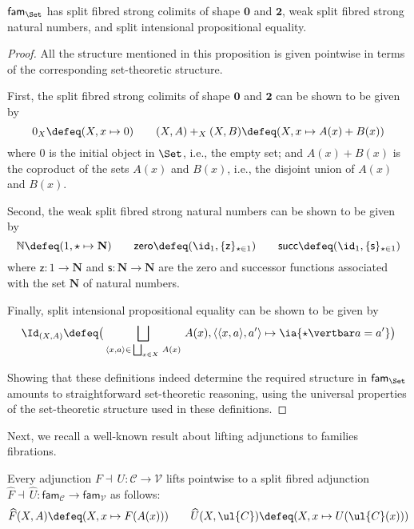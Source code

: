 \begin{proposition}
$\mathsf{fam}_{\Set}$ has split fibred strong colimits of shape $\mathbf{0}$ and $\mathbf{2}$, weak split fibred strong natural numbers, and split intensional propositional equality.
\end{proposition}

\begin{proof}
All the structure mentioned in this proposition is given pointwise in terms of the corresponding set-theoretic structure. 

First, the split fibred strong colimits of shape $\mathbf{0}$ and $\mathbf{2}$ can be shown to be given by
\[
0_X \defeq (X , x \mapsto 0) 
\qquad
(X,A) +_X (X,B) \defeq (X, x \mapsto A(x) + B(x))
\]
where $0$ is the initial object in $\Set$, i.e., the empty set; and $A(x) + B(x)$ is the coproduct of the sets $A(x)$ and $B(x)$, i.e., the disjoint union of $A(x)$ and $B(x)$.

Second, the weak split fibred strong natural numbers can be shown to be given by
\[
\mathbb{N} \defeq (1, \star \mapsto \mathbf{N})
\qquad
\mathsf{zero} \defeq (\id_1 , \{\mathsf{z}\}_{\star \in 1})
\qquad
\mathsf{succ} \defeq (\id_1, \{\mathsf{s}\}_{\star \in 1})
\]
where $\mathsf{z} : 1 \longrightarrow \mathbf{N}$ and $\mathsf{s} : \mathbf{N} \longrightarrow \mathbf{N}$ are the zero and successor functions associated with the set $\mathbf{N}$ of natural numbers.

Finally, split intensional propositional equality can be shown to be given by
\[
\Id_{(X,A)} \defeq \big(\bigsqcup_{\langle x , a \rangle \in\, \bigsqcup_{x \in X}\, A(x)}\, A(x) , \langle \langle x , a \rangle , a' \rangle \mapsto \ia {\star \vertbar a = a'}\big)
\]

Showing that these definitions indeed determine the required structure in $\mathsf{fam}_{\Set}$ amounts to straightforward set-theoretic reasoning, using the universal properties of the set-theoretic structure used in these definitions.
\end{proof}

Next, we recall a well-known result about lifting adjunctions to families fibrations.

\begin{proposition}
\label{prop:liftingadjunctionstofamilies}
Every adjunction $F \dashv\, U : \mathcal{C} \longrightarrow \mathcal{V}$ lifts pointwise to a split fibred adjunction $\widehat{F} \dashv\, \widehat{U} : \mathsf{fam}_{\mathcal{C}} \!\longrightarrow\! \mathsf{fam}_{\mathcal{V}}$ as follows:
\[
\widehat{F}(X,A) \defeq (X, x \mapsto F(A(x)))
\qquad
\widehat{U}(X,\ul{C}) \defeq (X, x \mapsto U(\ul{C}(x)))
\]
\end{proposition}

